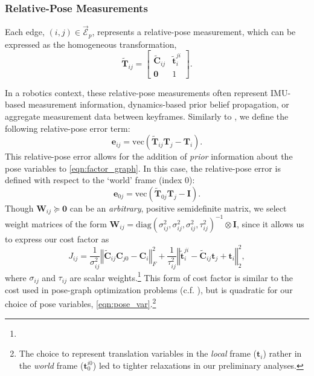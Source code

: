 \documentclass[lettersize,journal]{IEEEtran}
\newcommand{\EdgeSet}{\vec{\bm{\mathcal{E}}}}
\newcommand{\vect}[1]{\mbox{vec}(#1)}
\newcommand{\diag}[1]{\mbox{diag}\left(#1\right)}
\newcommand{\rev}[1]{\color{red}{#1}\color{black}}
\begin{document}
\subsubsection{Relative-Pose Measurements}\label{sec:RelPoseMeas}

Each edge, $(i,j) \in \EdgeSet_p $, represents a relative-pose measurement, which can be expressed as the homogeneous transformation,
\begin{equation}
	\tilde{\bm{T}}_{ij} = \begin{bmatrix}
		\tilde{\bm{C}}_{ij} & \tilde{\bm{t}}_i^{ji} \\ \bm{0} & 1
	\end{bmatrix}.
\end{equation}

In a robotics context, these relative-pose measurements often represent IMU-based measurement information, dynamics-based prior belief propagation, or aggregate measurement data between keyframes. Similarly to \cite{brialesCartanSyncFastGlobal2017}, we define the following relative-pose error term:
\begin{equation}\label{eqn:rel_pose_err}
	\bm{e}_{ij} = \vect{\tilde{\bm{T}}_{ij}\bm{T}_j - \bm{T}_i}.
\end{equation}
This relative-pose error allows for the addition of \emph{prior} information about the pose variables to \eqref{eqn:factor_graph}. In this case, the relative-pose error is defined with respect to the `world' frame (index $0$):
\begin{equation}\label{eqn:prior_pose_err}
	\bm{e}_{0j} = \vect{\tilde{\bm{T}}_{0j}\bm{T}_j - \bm{I}}.
\end{equation}
Though $\bm{W}_{ij} \succeq \bm{0} $ can be an \emph{arbitrary}, positive semidefinite matrix, we select weight matrices of the form $\bm{W}_{ij}=\diag{\sigma^2_{ij},\sigma^2_{ij},\sigma^2_{ij},\tau^2_{ij}}^{-1} \otimes \bm{I}$, since it allows us to express our cost factor as
\begin{equation}\label{eqn:rel_pose_cost}
	J_{ij} = \frac{1}{\sigma^2_{ij}} \left\Vert \tilde{\bm{C}}_{ij}\bm{C}_{j0} - \bm{C}_i\right\Vert_F^2 + \frac{1}{\tau^2_{ij}} \left\Vert \tilde{\bm{t}}^{ji}_{i} - \tilde{\bm{C}}_{ij}\bm{t}_j + \bm{t}_i \right\Vert_2^2,
\end{equation}
where $\sigma_{ij}$ and $\tau_{ij}$ are scalar weights.\footnote{\rev{Note that these weights represent isotropic noise.}} This form of cost factor is similar to the cost used in pose-graph optimization problems (c.f. \cite{brialesCartanSyncFastGlobal2017, rosenSESyncCertifiablyCorrect2019, holmesEfficientGlobalOptimality2023}), but is quadratic for our choice of pose variables, \eqref{eqn:pose_var}.\footnote{The choice to represent translation variables in the \emph{local} frame ($\bm{t}_i$) rather in the \emph{world} frame ($\bm{t}_0^{i0}$) led to tighter relaxations in our preliminary analyses.}
\end{document}
